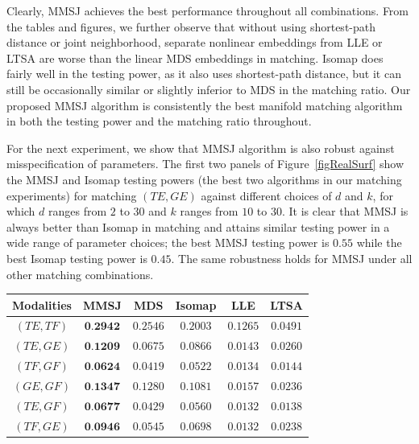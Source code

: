 \documentclass[times,twocolumn,final]{elsarticle}
\newenvironment{Table}
  {\par\bigskip\noindent\minipage{\columnwidth}\centering}
  {\endminipage\par\bigskip}
\begin{document}
Clearly, MMSJ achieves the best performance throughout all combinations. From the tables and figures, we further observe that without using shortest-path distance or joint neighborhood, separate nonlinear embeddings from LLE or LTSA are worse than the linear MDS embeddings in matching. Isomap does fairly well in the testing power, as it also uses shortest-path distance, but it can still be occasionally similar or slightly inferior to MDS in the matching ratio. Our proposed MMSJ algorithm is consistently the best manifold matching algorithm in both the testing power and the matching ratio throughout.

For the next experiment, we show that MMSJ algorithm is also robust against misspecification of parameters. The first two panels of Figure~\ref{figRealSurf} show the MMSJ and Isomap testing powers (the best two algorithms in our matching experiments) for matching $(TE,GE)$ against different choices of $d$ and $k$, for which $d$ ranges from $2$ to $30$ and $k$ ranges from $10$ to $30$. It is clear that MMSJ is always better than Isomap in matching and attains similar testing power in a wide range of parameter choices; the best MMSJ testing power is $0.55$ while the best Isomap testing power is $0.45$. The same robustness holds for MMSJ under all other matching combinations. 


\begin{Table}
\centering
{}
\label{table:wikiAcc}%
\begin{tabular}{|c||c|c|c|c|c|}
\hline
Modalities & MMSJ & MDS & Isomap & LLE & LTSA \\
\hline
$(TE, TF)$ & $\textbf{0.2942}$  & $0.2546$ & $0.2003$ & $0.1265$ & $0.0491$\\
\hline
$(TE, GE)$ & $\textbf{0.1209}$  & $0.0675$ & $0.0866$ & $0.0143$ & $0.0260$\\
\hline
$(TF, GF)$ & $\textbf{0.0624}$  & $0.0419$ & $0.0522$ & $0.0134$ & $0.0144$\\
\hline
$(GE, GF)$ & $\textbf{0.1347}$  & $0.1280$ & $0.1081$ & $0.0157$ & $0.0236$\\
\hline
$(TE, GF)$ & $\textbf{0.0677}$  & $0.0429$ & $0.0560$ & $0.0132$ & $0.0138$\\
\hline
$(TF, GE)$ & $\textbf{0.0946}$  & $0.0545$ & $0.0698$ & $0.0132$ & $0.0238$\\
\hline
\end{tabular}
\end{Table}
\end{document}
